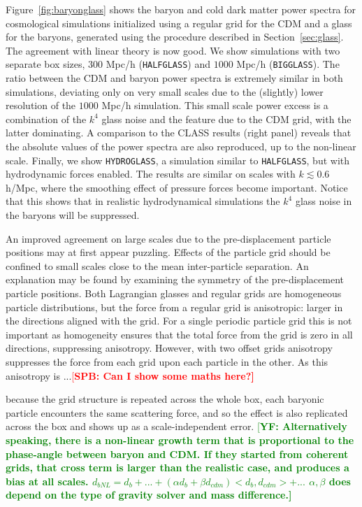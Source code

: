 \documentclass[a4paper,11pt]{article}
\newcommand{\spb}[1]{\textcolor{red}{[\bf SPB: #1]} }
\newcommand{\YF}[1]{\textcolor{green}{[\bf YF: #1]} }
\begin{document}
Figure~\ref{fig:baryonglass} shows the baryon and cold dark matter power spectra for cosmological simulations initialized using a regular grid for the CDM and a glass for the baryons, generated using the procedure described in Section~\ref{sec:glass}. The agreement with linear theory is now good. We show simulations with two separate box sizes, $300$ Mpc/h (\texttt{HALFGLASS}) and $1000$ Mpc/h (\texttt{BIGGLASS}). The ratio between the CDM and baryon power spectra is extremely similar in both simulations, deviating only on very small scales due to the (slightly) lower resolution of the $1000$ Mpc/h simulation. This small scale power excess is a combination of the $k^4$ glass noise and the feature due to the CDM grid, with the latter dominating. A comparison to the CLASS results (right panel) reveals that the absolute values of the power spectra are also reproduced, up to the non-linear scale. Finally, we show \texttt{HYDROGLASS}, a simulation similar to \texttt{HALFGLASS}, but with hydrodynamic forces enabled. The results are similar on scales with $k \lesssim 0.6$ h/Mpc, where the smoothing effect of pressure forces become important. Notice that this shows that in realistic hydrodynamical simulations the $k^4$ glass noise in the baryons will be suppressed.

An improved agreement on large scales due to the pre-displacement particle positions may at first appear puzzling. Effects of the particle grid should be confined to small scales close to the mean inter-particle separation. An explanation may be found by examining the symmetry of the pre-displacement particle positions. Both Lagrangian glasses and regular grids are homogeneous particle distributions, but the force from a regular grid is anisotropic: larger in the directions aligned with the grid. For a single periodic particle grid this is not important as homogeneity ensures that the total force from the grid is zero in all directions, suppressing anisotropy. However, with two offset grids anisotropy suppresses the force from each grid upon each particle in the other. As this anisotropy is ...\spb{Can I show some maths here?}

because the grid structure is repeated across the whole box, each baryonic particle encounters the same scattering force, and so the effect is also replicated across the box and shows up as a scale-independent error. \YF{Alternatively speaking, there is a non-linear growth term that is proportional to the phase-angle between baryon and CDM. If they started from coherent grids, that cross term is larger than the realistic case, and produces a bias at all scales. $d_{bNL} = d_{b} + ... + (\alpha d_b + \beta d_{cdm}) <d_{b}, d_{cdm}> + ...$ $\alpha, \beta$ does depend on the type of gravity solver and mass difference.}
\end{document}

